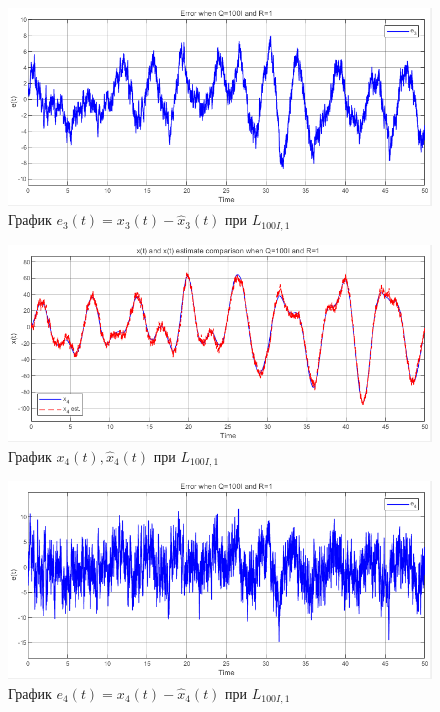 \documentclass[a4paper, 12pt]{article}
\begin{document}
    \begin{figure}[H]
        \centering
        \includegraphics[scale=0.75]{2task_ee3.png}
        \captionsetup{skip=0pt}
        \caption{График $e_3(t)=x_3(t)-\hat{x}_3(t)$ при $L_{100I,1}$}
        \label{fig:2task_ee3}
    \end{figure}
    \begin{figure}[H]
        \centering
        \includegraphics[scale=0.75]{2task_xx4.png}
        \captionsetup{skip=0pt}
        \caption{График $x_4(t),\hat{x}_4(t)$ при $L_{100I,1}$}
        \label{fig:2task_xx4}
    \end{figure}
    \begin{figure}[H]
        \centering
        \includegraphics[scale=0.75]{2task_ee4.png}
        \captionsetup{skip=0pt}
        \caption{График $e_4(t)=x_4(t)-\hat{x}_4(t)$ при $L_{100I,1}$}
        \label{fig:2task_ee4}
    \end{figure}
\end{document}
